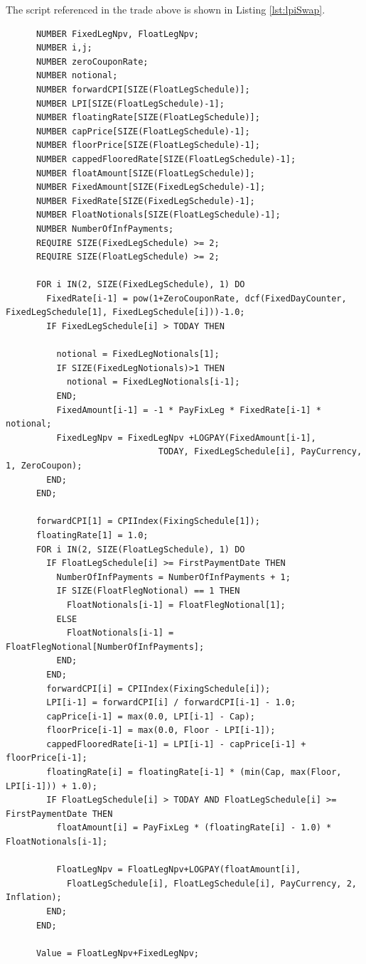 The script referenced in the trade above is shown in Listing \ref{lst:lpiSwap}.

\begin{listing}[hbt]
  \begin{verbatim}
      NUMBER FixedLegNpv, FloatLegNpv;
      NUMBER i,j;
      NUMBER zeroCouponRate;
      NUMBER notional;
      NUMBER forwardCPI[SIZE(FloatLegSchedule)];
      NUMBER LPI[SIZE(FloatLegSchedule)-1];
      NUMBER floatingRate[SIZE(FloatLegSchedule)];
      NUMBER capPrice[SIZE(FloatLegSchedule)-1];
      NUMBER floorPrice[SIZE(FloatLegSchedule)-1];
      NUMBER cappedFlooredRate[SIZE(FloatLegSchedule)-1];
      NUMBER floatAmount[SIZE(FloatLegSchedule)];
      NUMBER FixedAmount[SIZE(FixedLegSchedule)-1];
      NUMBER FixedRate[SIZE(FixedLegSchedule)-1];
      NUMBER FloatNotionals[SIZE(FloatLegSchedule)-1];
      NUMBER NumberOfInfPayments;
      REQUIRE SIZE(FixedLegSchedule) >= 2;
      REQUIRE SIZE(FloatLegSchedule) >= 2;

      FOR i IN(2, SIZE(FixedLegSchedule), 1) DO
        FixedRate[i-1] = pow(1+ZeroCouponRate, dcf(FixedDayCounter, FixedLegSchedule[1], FixedLegSchedule[i]))-1.0;
        IF FixedLegSchedule[i] > TODAY THEN

          notional = FixedLegNotionals[1];
          IF SIZE(FixedLegNotionals)>1 THEN
            notional = FixedLegNotionals[i-1];
          END;
          FixedAmount[i-1] = -1 * PayFixLeg * FixedRate[i-1] * notional;
          FixedLegNpv = FixedLegNpv +LOGPAY(FixedAmount[i-1],
                              TODAY, FixedLegSchedule[i], PayCurrency, 1, ZeroCoupon);
        END;
      END;

      forwardCPI[1] = CPIIndex(FixingSchedule[1]);
      floatingRate[1] = 1.0;
      FOR i IN(2, SIZE(FloatLegSchedule), 1) DO
        IF FloatLegSchedule[i] >= FirstPaymentDate THEN
          NumberOfInfPayments = NumberOfInfPayments + 1;
          IF SIZE(FloatFlegNotional) == 1 THEN
            FloatNotionals[i-1] = FloatFlegNotional[1];
          ELSE
            FloatNotionals[i-1] = FloatFlegNotional[NumberOfInfPayments];
          END;
        END;
        forwardCPI[i] = CPIIndex(FixingSchedule[i]);
        LPI[i-1] = forwardCPI[i] / forwardCPI[i-1] - 1.0;
        capPrice[i-1] = max(0.0, LPI[i-1] - Cap);
        floorPrice[i-1] = max(0.0, Floor - LPI[i-1]);
        cappedFlooredRate[i-1] = LPI[i-1] - capPrice[i-1] + floorPrice[i-1];
        floatingRate[i] = floatingRate[i-1] * (min(Cap, max(Floor, LPI[i-1])) + 1.0);
        IF FloatLegSchedule[i] > TODAY AND FloatLegSchedule[i] >= FirstPaymentDate THEN
          floatAmount[i] = PayFixLeg * (floatingRate[i] - 1.0) * FloatNotionals[i-1];

          FloatLegNpv = FloatLegNpv+LOGPAY(floatAmount[i],
            FloatLegSchedule[i], FloatLegSchedule[i], PayCurrency, 2, Inflation);
        END;
      END;

      Value = FloatLegNpv+FixedLegNpv;
\end{verbatim}
  \caption{Payoff script for an LPI Swap.}
  \label{lst:lpiSwap}
\end{listing}

